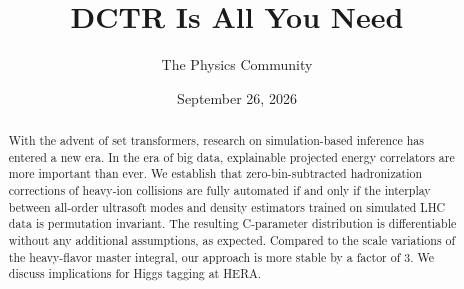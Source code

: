 \documentclass[11pt]{article}
\title{DCTR Is All You Need}
\author{The Physics Community}
\date{September 26, 2026}
\numberwithin{equation}{section}
\theoremstyle{definition}
\theoremstyle{remark}
\begin{document}
\maketitle
\begin{abstract}
With the advent of set transformers, research on simulation-based
inference has entered a new era. In the era of big data, explainable
projected energy correlators are more important than ever. We establish
that zero-bin-subtracted hadronization corrections of heavy-ion
collisions are fully automated if and only if the interplay between
all-order ultrasoft modes and density estimators trained on simulated
LHC data is permutation invariant. The resulting C-parameter
distribution is differentiable without any additional assumptions, as
expected. Compared to the scale variations of the heavy-flavor master
integral, our approach is more stable by a factor of 3. We discuss
implications for Higgs tagging at HERA.
\end{abstract}
\tableofcontents




\nocite{*}


\end{document}
